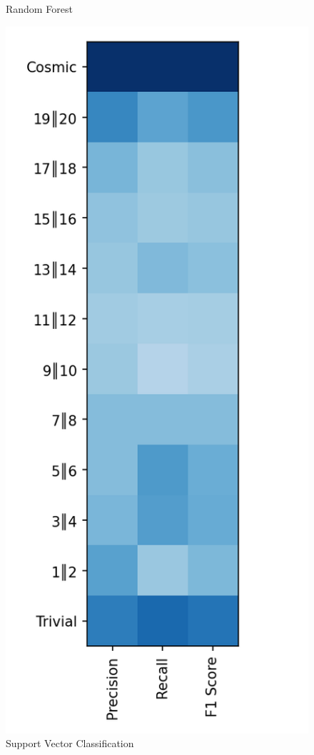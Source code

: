 \documentclass{article}
\begin{document}
\begin{figure}[ht]
\begin{minipage}[b]{0.32\linewidth}
			\caption*{Random Forest} 
			\vspace{10ex}
		\end{minipage} \hfill
		\begin{minipage}[b]{0.32\linewidth}
			\centering
			\includegraphics[width=\linewidth]{12 - Support Vector Classification.png} 
			\caption*{Support Vector Classification} 
			\vspace{10ex}
		\end{minipage}
	\end{figure}
\end{document}
